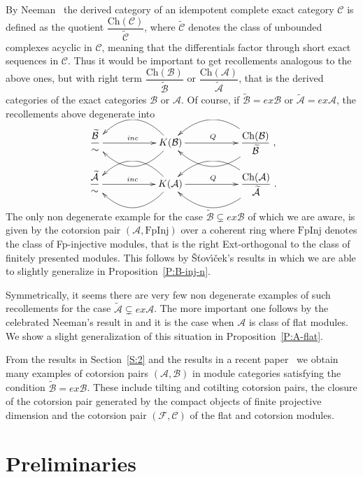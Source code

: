\documentclass[11pt,a4paper,reqno]{amsart}
\newcommand{\sto}{ {\v{S}}{\v{t}}ov{\'{\i}}{\v{c}}ek}
\newcommand{\A}{\mathcal{A}}
\newcommand{\B}{\mathcal{B}}
\newcommand{\C}{\mathcal{C}}
\newcommand{\F}{\mathcal{F}}
\newcommand{\Ch}{\mathrm{Ch}}
\newcommand{\FpInj}{\mathrm{FpInj}}
\theoremstyle{plain}
\theoremstyle{definition}
\theoremstyle{remark}
\begin{document}
By Neeman~\cite{Nee90} the derived category of an idempotent complete exact category $\C$ is defined as the quotient $\dfrac{\Ch(\C)}{\widetilde{\C}}$, where $\widetilde{\C}$ denotes the class of unbounded complexes acyclic in $\C$, meaning that the differentials factor through short exact sequences in $\C$.
Thus it would be important to get recollements analogous to the above ones, but with right term $\dfrac{\Ch(\B)}{\widetilde{\B}}$ or $\dfrac{\Ch(\A)}{\widetilde{\A}}$, that is the derived categories of the exact categories $\B$ or $\A$. Of course, if $\widetilde{\B}=ex\B$ or $\widetilde{\A}=ex{\A}$, the recollements above degenerate into
\vskip0.7cm
\[
\xymatrix{\dfrac{\widetilde{\B}}{\sim} \ar[rr]^{inc} &&{K(\B)} \ar@/^2pc/[ll]\ar@/_2pc/[ll] \ar[rr]^{Q}
&&{\dfrac{\Ch(\B)}{\widetilde{\B} }}\ar@/^2pc/ [ll] \ar@/_2pc/ [ll] }
,\]
\vskip0.7cm

\[
\xymatrix{\dfrac{\widetilde{\A}}{\sim} \ar[rr]^{inc} &&{K(\A)} \ar@/^2pc/[ll]\ar@/_2pc/[ll] \ar[rr]^{Q}
&&{\dfrac{\Ch(\A)}{\widetilde{\A} }}\ar@/^2pc/ [ll] \ar@/_2pc/ [ll] }
.\]
\vskip0.7cm

The only non degenerate example for the case $\widetilde{\B}\subsetneq ex\B$ of which we are aware, is given by the cotorsion pair $(\A, \FpInj)$ over a coherent ring where $\FpInj$ denotes the class of Fp-injective modules, that is the right Ext-orthogonal to the class of finitely presented modules. This follows by \sto's results in \cite{sto14} which we are able to slightly generalize in Proposition~\ref{P:B-inj-n}.

Symmetrically, it seems there are very few non degenerate examples of such recollements for the case $\widetilde{\A}\subsetneq ex\A$. The more important one follows by the celebrated Neeman's result in \cite{Nee08} and it is the case when $\A$ is class of flat modules. We show a slight generalization of this situation in Proposition~\ref{P:A-flat}.%

From the results in Section~\ref{S:2} and the results in a recent paper~\cite{BCIE} we obtain many examples of cotorsion pairs $(\A, \B)$ in module categories satisfying the condition $\widetilde{\B}=ex\B$. These include tilting and cotilting cotorsion pairs, the closure of the cotorsion pair generated by the compact objects of finite projective dimension and the cotorsion pair $(\F, \C)$ of the flat and cotorsion modules.

\section{Preliminaries}
\end{document}
